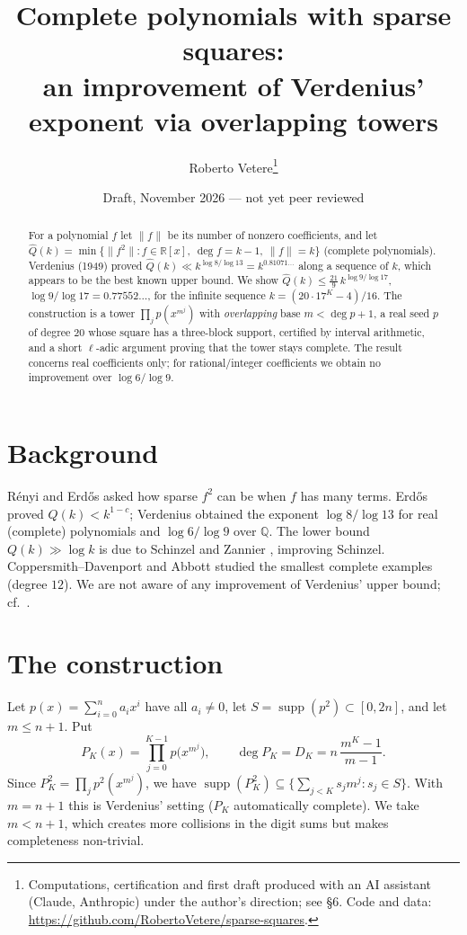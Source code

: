 \documentclass[11pt]{article}
\title{Complete polynomials with sparse squares:\\ an improvement of Verdenius' exponent via overlapping towers}
\author{Roberto Vetere\thanks{Computations, certification and first draft produced with an AI assistant (Claude, Anthropic) under the author's direction; see \S6. Code and data: \url{https://github.com/RobertoVetere/sparse-squares}.}}
\date{Draft, November 2026 --- not yet peer reviewed}
\theoremstyle{remark}\newtheorem*{remark}{Remark}
\newcommand{\supp}{\operatorname{supp}}
\begin{document}
\maketitle

\begin{abstract}
For a polynomial $f$ let $\|f\|$ be its number of nonzero coefficients, and let $\hat Q(k)=\min\{\|f^2\| : f\in\mathbb R[x],\ \deg f=k-1,\ \|f\|=k\}$ (complete polynomials).
Verdenius (1949) proved $\hat Q(k)\ll k^{\log 8/\log 13}=k^{0.81071\ldots}$ along a sequence of $k$, which appears to be the best known upper bound.
We show $\hat Q(k)\le \tfrac{21}{9}\,k^{\log 9/\log 17}$, $\log 9/\log 17=0.77552\ldots$, for the infinite sequence $k=(20\cdot 17^K-4)/16$.
The construction is a tower $\prod_j p(x^{m^j})$ with \emph{overlapping} base $m<\deg p+1$, a real seed $p$ of degree $20$ whose square has a three-block support, certified by interval arithmetic, and a short $\ell$-adic argument proving that the tower stays complete.
The result concerns real coefficients only; for rational/integer coefficients we obtain no improvement over $\log 6/\log 9$.
\end{abstract}

\section{Background}
R\'enyi and Erd\H{o}s asked how sparse $f^2$ can be when $f$ has many terms. Erd\H{o}s \cite{E} proved $Q(k)<k^{1-c}$; Verdenius \cite{V} obtained the exponent $\log 8/\log 13$ for real (complete) polynomials and $\log 6/\log 9$ over $\mathbb Q$. The lower bound $Q(k)\gg\log k$ is due to Schinzel and Zannier \cite{S,SZ}, improving Schinzel. Coppersmith--Davenport \cite{CD} and Abbott \cite{A} studied the smallest complete examples (degree $12$). We are not aware of any improvement of Verdenius' upper bound; cf.\ \cite{SZ,M,EP}.

\section{The construction}
Let $p(x)=\sum_{i=0}^n a_ix^i$ have all $a_i\neq 0$, let $S=\supp(p^2)\subset[0,2n]$, and let $m\le n+1$. Put
\[P_K(x)=\prod_{j=0}^{K-1}p\bigl(x^{m^j}\bigr),\qquad \deg P_K=D_K=n\,\frac{m^K-1}{m-1}.\]
Since $P_K^2=\prod_j p^2(x^{m^j})$, we have $\supp(P_K^2)\subseteq\{\sum_{j<K}s_jm^j: s_j\in S\}$.
With $m=n+1$ this is Verdenius' setting ($P_K$ automatically complete). We take $m<n+1$, which creates more collisions in the digit sums but makes completeness non-trivial.
\end{document}
